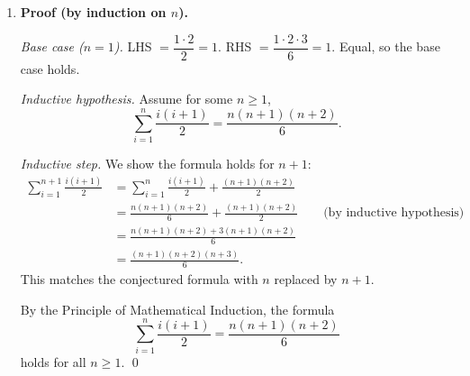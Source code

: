 \documentclass[11pt]{article}
\begin{document}
\begin{solution}
\begin{enumerate}[label=(\alph*)]
    \item \textbf{Proof (by induction on $n$).}

        \emph{Base case ($n=1$).} LHS $=\dfrac{1\cdot2}{2}=1$.
        RHS $=\dfrac{1\cdot2\cdot3}{6}=1$. Equal, so the base case holds.

        \emph{Inductive hypothesis.} Assume for some $n\ge1$,
        \[
            \sum_{i=1}^{n}\frac{i(i+1)}{2} = \frac{n(n+1)(n+2)}{6}.
        \]

        \emph{Inductive step.} We show the formula holds for $n+1$:
        \begin{align*}
            \sum_{i=1}^{n+1}\frac{i(i+1)}{2}
            &= \sum_{i=1}^{n}\frac{i(i+1)}{2} + \frac{(n+1)(n+2)}{2} \\
            &= \frac{n(n+1)(n+2)}{6} + \frac{(n+1)(n+2)}{2}
                \qquad \text{(by inductive hypothesis)} \\
            &= \frac{n(n+1)(n+2) + 3(n+1)(n+2)}{6} \\
            &= \frac{(n+1)(n+2)(n+3)}{6}.
        \end{align*}
        This matches the conjectured formula with $n$ replaced by $n+1$.

        By the Principle of Mathematical Induction, the formula
        \[
            \sum_{i=1}^{n}\frac{i(i+1)}{2} = \frac{n(n+1)(n+2)}{6}
        \]
        holds for all $n\ge1$. \qed
    \end{enumerate}
\end{solution}
\end{document}
